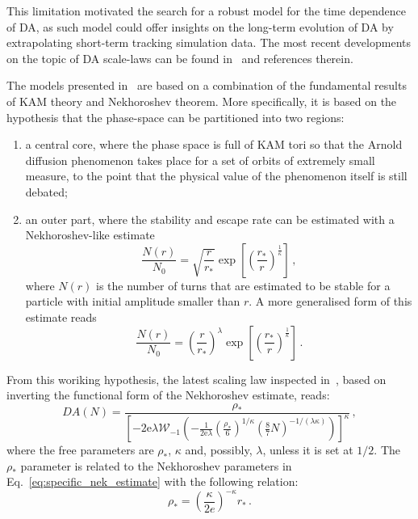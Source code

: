 This limitation motivated the search for a robust model for the time dependence of DA, as such model could offer insights on the long-term evolution of DA by extrapolating short-term tracking simulation data. The most recent developments on the topic of DA scale-laws can be found in~\cite{Bazzani:2019csk} and references therein.

The models presented in~\cite{Bazzani:2019csk} are based on a combination of the fundamental results of KAM theory and Nekhoroshev theorem. More specifically, it is based on the hypothesis that the phase-space can be partitioned into two regions: 
\begin{enumerate}
	\item a central core, where the phase space is full of KAM tori so that the Arnold diffusion phenomenon takes place for a set of orbits of extremely small measure, to the point that the physical value of the phenomenon itself is still debated;
	\item an outer part, where the stability and escape rate can be estimated with a Nekhoroshev-like estimate
	\begin{equation}
		\frac{N(r)}{N_0} = \sqrt{\frac{r}{r_\ast}} \exp\left[\left(\frac{r_\ast}{r}\right)^{\frac{1}{\kappa}}\right]\,,
        \label{eq:specific_nek_estimate}
	\end{equation}
	where \(N(r)\) is the number of turns that are estimated to be stable for a particle with initial amplitude smaller than \(r\). A more generalised form of this estimate reads
    \begin{equation}
        \frac{N(r)}{N_0} = \left(\frac{r}{r_\ast}\right)^{\lambda} \exp\left[\left(\frac{r_\ast}{r}\right)^{\frac{1}{\kappa}}\right]\,.
    \end{equation}
\end{enumerate}

From this woriking hypothesis, the latest scaling law inspected in~\cite{Bazzani:2019csk}, based on inverting the functional form of the Nekhoroshev estimate, reads:
\begin{equation}
	DA(N) = \frac{\rho_\ast}{\left[-2 \mathrm{e} \lambda \mathcal{W}_{-1}\left(-\frac{1}{2 \mathrm{e} \lambda}\left(\frac{\rho_*}{6}\right)^{1 / \kappa}\left(\frac{8}{7} N\right)^{-1 /(\lambda \kappa)}\right)\right]^\kappa}\,,
	\label{eq:giova_interpolation}
\end{equation}
where the free parameters are $\rho_\ast$, $\kappa$ and, possibly, $\lambda$, unless it is set at $1/2$. The $\rho_\ast$ parameter is related to the Nekhoroshev parameters in Eq.~\eqref{eq:specific_nek_estimate} with the following relation:
\begin{equation}
    \rho_\ast = \left(\frac{\kappa}{2e}\right)^{-\kappa} r_\ast \,.
\end{equation}

